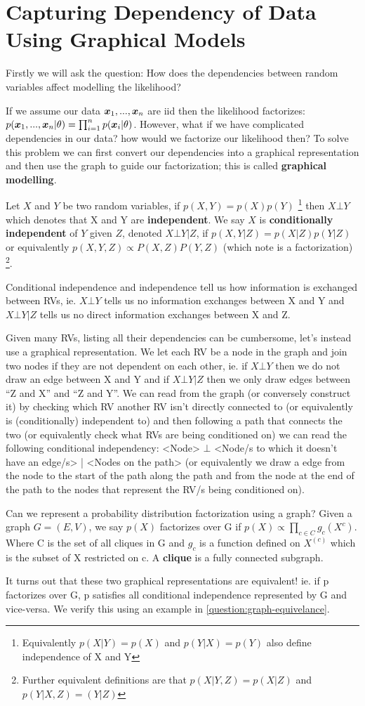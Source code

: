 \section{Capturing Dependency of Data Using Graphical Models}\label{section:sectionone}
Firstly we will ask the question: How does the dependencies between random variables affect modelling the likelihood? 

If we assume our data $\bm{x}_{1},...,\bm{x}_{n}$ are iid then the likelihood factorizes: $p( \bm{x}_{1}, ... , \bm{x}_{n} | \theta) = \prod_{i=1}^{n} p( \bm{x}_{i} | \theta )$. However, what if we have complicated dependencies in our data? how would we factorize our likelihood then? To solve this problem we can first convert our dependencies into a graphical representation and then use the graph to guide our factorization; this is called \textbf{graphical modelling}. 

Let $X$ and $Y$ be two random variables, if $p(X,Y) = p(X) p(Y)$ \footnote{Equivalently $p(X|Y)=p(X)$ and $p(Y|X)=p(Y)$ also define independence of X and Y} then $X \bot Y$ which denotes that X and Y are \textbf{independent}. We say $X$ is \textbf{conditionally independent} of $Y$ given $Z$, denoted $X \bot Y|Z$, if $p(X,Y|Z)= p(X|Z) p(Y|Z)$ or equivalently $p(X,Y,Z) \propto P(X,Z) P(Y,Z)$ (which note is a factorization) \footnote{Further equivalent definitions are that $p(X|Y,Z)=p(X|Z)$ and $p(Y|X,Z)=(Y|Z)$}. 

Conditional independence and independence tell us how information is exchanged between RVs, ie. $X \bot Y$ tells us no information exchanges between X and Y and $X \bot Y|Z$ tells us no direct information exchanges between X and Z. 

Given many RVs, listing all their dependencies can be cumbersome, let's instead use a graphical representation. We let each RV be a node in the graph and join two nodes if they are not dependent on each other, ie. if $X \bot Y$ then we do not draw an edge between X and Y and if $X \bot Y|Z$ then we only draw edges between ``Z and X'' and ``Z and Y''. We can read from the graph (or conversely construct it) by checking which RV another RV isn't directly connected to (or equivalently is (conditionally) independent to) and then following a path that connects the two (or equivalently check what RVs are being conditioned on) we can read the following conditional independency: <Node> $\bot$ <Node/s to which it doesn't have an edge/s> | <Nodes on the path> (or equivalently we draw a edge from the node to the start of the path along the path and from the node at the end of the path to the nodes that represent the RV/s being conditioned on).

Can we represent a probability distribution factorization using a graph? Given a graph $G= (E,V)$, we say $p(X)$ factorizes over G if $p(X) \propto \prod_{c \in C} g_{c}(X^{c})$. Where C is the set of all cliques in G and $g_{c}$ is a function defined on $X^{(c)}$ which is the subset of X restricted on c. A \textbf{clique} is a fully connected subgraph.  

It turns out that these two graphical representations are equivalent! ie. if p factorizes over G, p satisfies all conditional independence represented by G and vice-versa. We verify this using an example in \cref{question:graph-equivelance}.